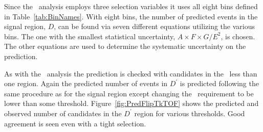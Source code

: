 Since the \tktof\ analysis employs three selection variables it uses all eight bins defined in Table~\ref{tab:BinNames}.
With eight bins, the number of predicted events in the signal region, $D$, can be found via seven different equations utilizing the various bins. The one with the smallest
statistical uncertainty, $A\times F\times G/E^2$, is chosen. The other equations are used to determine the systematic uncertainty on the prediction.

As with the \muononly\ analysis the prediction is checked with candidates in the \invbeta\ less than one region. Again the predicted number of events in
$D^{\prime}$ is predicted following the same procedure as for the signal region except changing the \invbeta\ requirement to be lower than some threshold.
Figure~\ref{fig:PredFlipTkTOF} shows the predicted and observed number of candidates in the $D^{\prime}$ region for various thresholds. Good agreement is seen
even with a tight selection.

